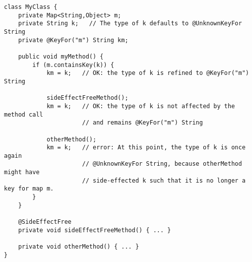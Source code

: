 \begin{verbatim}
class MyClass {
    private Map<String,Object> m;
    private String k;   // The type of k defaults to @UnknownKeyFor String
    private @KeyFor("m") String km;

    public void myMethod() {
        if (m.containsKey(k)) {
            km = k;   // OK: the type of k is refined to @KeyFor("m") String

            sideEffectFreeMethod();
            km = k;   // OK: the type of k is not affected by the method call
                      // and remains @KeyFor("m") String

            otherMethod();
            km = k;   // error: At this point, the type of k is once again
                      // @UnknownKeyFor String, because otherMethod might have
                      // side-effected k such that it is no longer a key for map m.
        }
    }

    @SideEffectFree
    private void sideEffectFreeMethod() { ... }

    private void otherMethod() { ... }
}
\end{verbatim}


